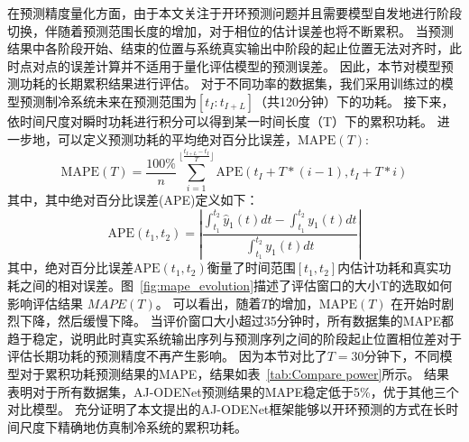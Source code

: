 在预测精度量化方面，由于本文关注于开环预测问题并且需要模型自发地进行阶段切换，伴随着预测范围长度的增加，对于相位的估计误差也将不断累积。
当预测结果中各阶段开始、结束的位置与系统真实输出中阶段的起止位置无法对齐时，此时点对点的误差计算并不适用于量化评估模型的预测误差。
因此，本节对模型预测功耗的长期累积结果进行评估。
对于不同功率的数据集，我们采用训练过的模型预测制冷系统未来在预测范围为$[{t_I:t_{I+L}}]$（共120分钟）下的功耗。
接下来，依时间尺度对瞬时功耗进行积分可以得到某一时间长度（T）下的累积功耗。
进一步地，可以定义预测功耗的平均绝对百分比误差，$\text{MAPE}(T)$:
\vspace{-5pt}
\begin{equation}
\text{MAPE}(T) = \frac{100\%}{n}\sum\limits_{i=1}^{\lfloor\frac{t_{I+L}-t_I}{T}\rfloor}\text{APE}(t_I+T*(i-1),t_I+T*i)
\label{equ:energy_mape}
\end{equation}
其中，其中绝对百分比误差(APE)定义如下：
\begin{equation}
\text{APE}(t_1,t_2) = \left|\frac{\int_{t_1}^{t_2}\hat{y}_1(t)dt-\int_{t_1}^{t_2}y_1(t)dt}{\int_{t_1}^{t_2}y_1(t)dt}\right|
\end{equation}
其中，绝对百分比误差$\text{APE}(t_1,t_2)$衡量了时间范围$[t_1, t_2]$内估计功耗和真实功耗之间的相对误差。图~\ref{fig:mape_evolution}描述了评估窗口的大小T的选取如何影响评估结果 $MAPE(T)$。
可以看出，随着$T$的增加，$\text{MAPE}(T)$ 在开始时剧烈下降，然后缓慢下降。
当评价窗口大小超过35分钟时，所有数据集的MAPE都趋于稳定，说明此时真实系统输出序列与预测序列之间的阶段起止位置相位差对于评估长期功耗的预测精度不再产生影响。
因为本节对比了$T=30$分钟下，不同模型对于累积功耗预测结果的MAPE，结果如表~\ref{tab:Compare power}所示。
结果表明对于所有数据集，AJ-ODENet预测结果的MAPE稳定低于5\%，优于其他三个对比模型。
充分证明了本文提出的AJ-ODENet框架能够以开环预测的方式在长时间尺度下精确地仿真制冷系统的累积功耗。

